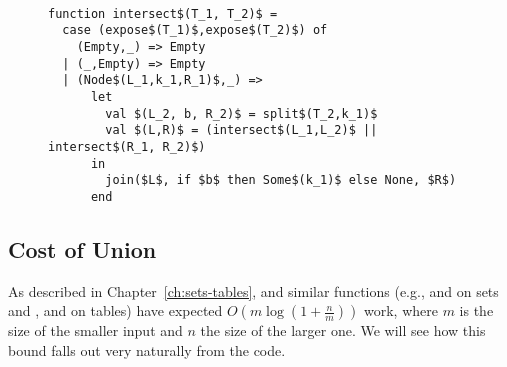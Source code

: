 \begin{figure}
\begin{algorithm}~
\label{alg:intersect}
\begin{lstlisting}
function intersect$(T_1, T_2)$ =
  case (expose$(T_1)$,expose$(T_2)$) of
    (Empty,_) => Empty
  | (_,Empty) => Empty
  | (Node$(L_1,k_1,R_1)$,_) =>
      let 
        val $(L_2, b, R_2)$ = split$(T_2,k_1)$
        val $(L,R)$ = (intersect$(L_1,L_2)$ || intersect$(R_1, R_2)$)
      in 
        join($L$, if $b$ then Some$(k_1)$ else None, $R$)
      end
\end{lstlisting}
\end{algorithm}
\end{figure}

%
%



\subsection*{Cost of Union}

As described in Chapter~\ref{ch:sets-tables}, \cunion{} and similar
functions (e.g.,  and  on sets
and ,  and  on tables) have
expected $O(m \log (1 + \tfrac{n}m))$ work, where $m$ is the size of
the smaller input and $n$ the size of the larger one.
We will see how
this bound falls out very naturally from the  code.

